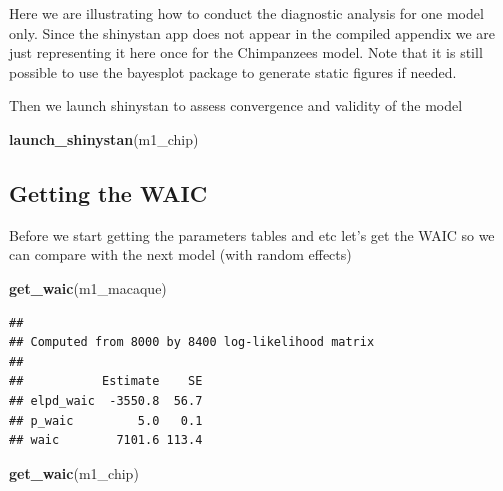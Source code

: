 \documentclass[
]{book}
\newenvironment{Shaded}{\begin{snugshade}}{\end{snugshade}}
\newcommand{\CommentTok}[1]{\textcolor[rgb]{0.56,0.35,0.01}{\textit{#1}}}
\newcommand{\DataTypeTok}[1]{\textcolor[rgb]{0.13,0.29,0.53}{#1}}
\newcommand{\DecValTok}[1]{\textcolor[rgb]{0.00,0.00,0.81}{#1}}
\newcommand{\KeywordTok}[1]{\textcolor[rgb]{0.13,0.29,0.53}{\textbf{#1}}}
\newcommand{\NormalTok}[1]{#1}
\newcommand{\OperatorTok}[1]{\textcolor[rgb]{0.81,0.36,0.00}{\textbf{#1}}}
\newcommand{\StringTok}[1]{\textcolor[rgb]{0.31,0.60,0.02}{#1}}
\begin{document}
Here we are illustrating how to conduct the diagnostic analysis for one model only. Since the shinystan app does not appear in the compiled appendix we are just representing it here once for the Chimpanzees model. Note that it is still possible to use the bayesplot package to generate static figures if needed.

\begin{Shaded}
\end{Shaded}

Then we launch shinystan to assess convergence and validity of the model

\begin{Shaded}
\begin{Highlighting}[]
\KeywordTok{launch_shinystan}\NormalTok{(m1_chip)}
\end{Highlighting}
\end{Shaded}

\hypertarget{getting-the-waic}{%
\subsection{Getting the WAIC}\label{getting-the-waic}}

Before we start getting the parameters tables and etc let's get the WAIC so we can compare with the next model (with random effects)

\begin{Shaded}
\begin{Highlighting}[]
\KeywordTok{get_waic}\NormalTok{(m1_macaque)}
\end{Highlighting}
\end{Shaded}

\begin{verbatim}
## 
## Computed from 8000 by 8400 log-likelihood matrix
## 
##           Estimate    SE
## elpd_waic  -3550.8  56.7
## p_waic         5.0   0.1
## waic        7101.6 113.4
\end{verbatim}

\begin{Shaded}
\begin{Highlighting}[]
\KeywordTok{get_waic}\NormalTok{(m1_chip)}
\end{Highlighting}
\end{Shaded}
\end{document}
